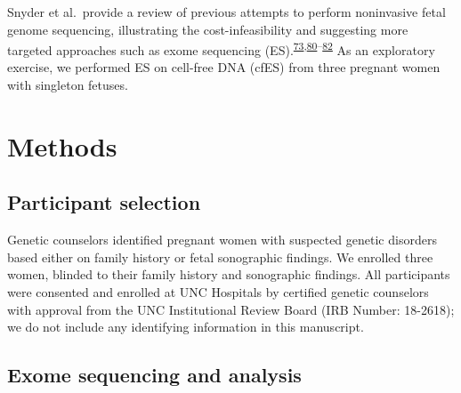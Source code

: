 \documentclass[11pt,letterpaper]{book}
\begin{document}
Snyder et al.~provide a review of previous attempts to perform noninvasive fetal genome sequencing, illustrating the cost-infeasibility and suggesting more targeted approaches such as exome sequencing (ES).\textsuperscript{\protect\hyperlink{ref-lo:2010aa}{73},\protect\hyperlink{ref-fan:2012aa}{80}--\protect\hyperlink{ref-snyder:2013aa}{82}}
As an exploratory exercise, we performed ES on cell-free DNA (cfES) from three pregnant women with singleton fetuses.

\hypertarget{methods-1}{%
\section{Methods}\label{methods-1}}

\hypertarget{participant-selection}{%
\subsection{Participant selection}\label{participant-selection}}

Genetic counselors identified pregnant women with suspected genetic disorders based either on family history or fetal sonographic findings.
We enrolled three women, blinded to their family history and sonographic findings.
All participants were consented and enrolled at UNC Hospitals by certified genetic counselors with approval from the UNC Institutional Review Board (IRB Number: 18-2618); we do not include any identifying information in this manuscript.

\hypertarget{exome-sequencing-and-analysis}{%
\subsection{Exome sequencing and analysis}\label{exome-sequencing-and-analysis}}
\end{document}
